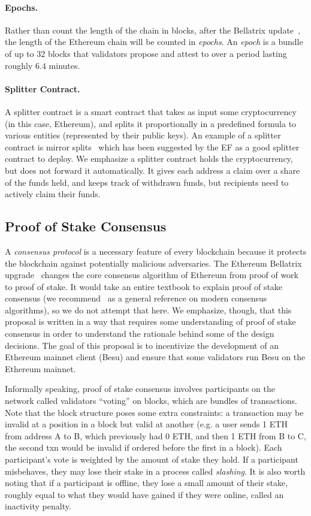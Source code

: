 \paragraph{Epochs.}  Rather than count the length of the chain in blocks, after the Bellatrix update~\cite{EthBella}, the length of the Ethereum chain will be counted in \emph{epochs}.  An \emph{epoch} is a bundle of up to 32 blocks that validators propose and attest to over a period lasting roughly $6.4$ minutes.

\paragraph{Splitter Contract.}  A splitter contract is a smart contract that takes as input some cryptocurrency (in this case, Ethereum), and splits it proportionally in a predefined formula to various entities (represented by their public keys).  An example of a splitter contract is mirror splits~\cite{Mirror} which has been suggested by the EF as a good splitter contract to deploy.  We emphasize a splitter contract holds the cryptocurrency, but does not forward it automatically. It gives each address a claim over a share of the funds held, and keeps track of withdrawn funds, but recipients need to actively claim their funds. 

\subsection{Proof of Stake Consensus}
A \emph{consensus protocol} is a necessary feature of every blockchain because it protects the blockchain against potentially malicious adversaries.  The Ethereum Bellatrix upgrade~\cite{EthBella} changes the core consensus algorithm of Ethereum from proof of work to proof of stake.  It would take an entire textbook to explain proof of stake consensus (we recommend~\cite{ShiBook} as a general reference on modern consensus algorithms), so we do not attempt that here.  We emphasize, though, that this proposal is written in a way that requires some understanding of proof of stake consensus in order to understand the rationale behind some of the design decisions.  The goal of this proposal is to incentivize the development of an Ethereum mainnet client (Besu) and ensure that some validators run Besu on the Ethereum mainnet.

Informally speaking, proof of stake consensus involves participants on the network called validators ``voting'' on blocks, which are bundles of transactions. Note that the block structure poses some extra constraints:  a transaction may be invalid at a position in a block but valid at another (e.g. a user sends 1 ETH from address A to B, which previously had 0 ETH, and then 1 ETH from B to C, the second txn would be invalid if ordered before the first in a block).   Each participant's vote is weighted by the amount of stake they hold.  If a participant misbehaves, they may lose their stake in a process called \emph{slashing}.  It is also worth noting that if a participant is offline, they lose a small amount of their stake, roughly equal to what they would have gained if they were online, called an inactivity penalty. 

